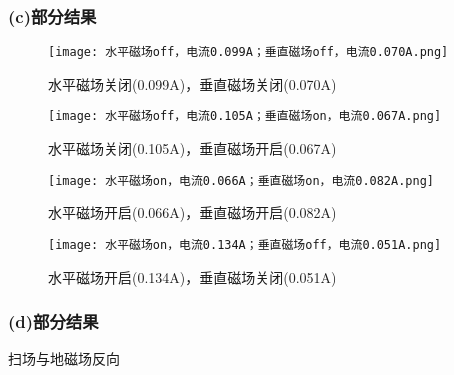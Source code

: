 \subsubsection{(c)部分结果}

\begin{figure}[H]
    \centering
    \begin{minipage}[b]{0.45\linewidth}
        \centering
        \texttt{[image: 水平磁场off，电流0.099A；垂直磁场off，电流0.070A.png]}
        \caption{水平磁场关闭(0.099A)，垂直磁场关闭(0.070A)}
        \label{fig:h_off_v_off}
    \end{minipage}
    \hfill
    \begin{minipage}[b]{0.45\linewidth}
        \centering
        \texttt{[image: 水平磁场off，电流0.105A；垂直磁场on，电流0.067A.png]}
        \caption{水平磁场关闭(0.105A)，垂直磁场开启(0.067A)}
        \label{fig:h_off_v_on}
    \end{minipage}

    \label{fig:horizontal_off}
\end{figure}

\begin{figure}[H]
    \centering
    \begin{minipage}[b]{0.48\linewidth}
        \centering
        \texttt{[image: 水平磁场on，电流0.066A；垂直磁场on，电流0.082A.png]}
        \caption{水平磁场开启(0.066A)，垂直磁场开启(0.082A)}
        \label{fig:h_on_v_on}
    \end{minipage}
    \hfill
    \begin{minipage}[b]{0.48\linewidth}
        \centering
        \texttt{[image: 水平磁场on，电流0.134A；垂直磁场off，电流0.051A.png]}
        \caption{水平磁场开启(0.134A)，垂直磁场关闭(0.051A)}
        \label{fig:h_on_v_off}
    \end{minipage}

    \label{fig:horizontal_on}
\end{figure}










\subsubsection{(d)部分结果}
扫场与地磁场反向

